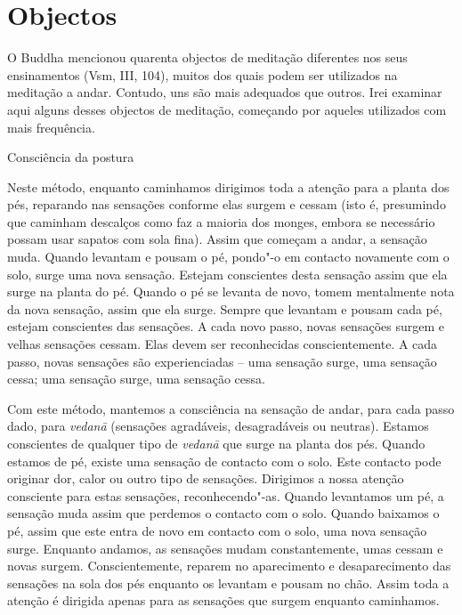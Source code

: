 
\chapter{Objectos}

O Buddha mencionou quarenta objectos de meditação diferentes nos
seus ensinamentos (Vsm, III, 104), muitos dos quais podem ser utilizados
na meditação a andar. Contudo, uns são mais adequados que outros. Irei
examinar aqui alguns desses objectos de meditação, começando por aqueles
utilizados com mais frequência.

\begin{siderule-quote}
  Consciência da postura
\end{siderule-quote}

Neste método, enquanto caminhamos dirigimos toda a atenção para a planta
dos pés, reparando nas sensações conforme elas surgem e cessam (isto é,
presumindo que caminham descalços como faz a maioria dos monges, embora
se necessário possam usar sapatos com sola fina). Assim que começam a
andar, a sensação muda. Quando levantam e pousam o pé, pondo"-o em
contacto novamente com o solo, surge uma nova sensação. Estejam
conscientes desta sensação assim que ela surge na planta do pé. Quando o
pé se levanta de novo, tomem mentalmente nota da nova sensação, assim
que ela surge. Sempre que levantam e pousam cada pé, estejam conscientes
das sensações. A cada novo passo, novas sensações surgem e velhas
sensações cessam. Elas devem ser reconhecidas conscientemente. A cada
passo, novas sensações são experienciadas -- uma sensação surge, uma
sensação cessa; uma sensação surge, uma sensação cessa.

Com este método, mantemos a consciência na sensação de andar, para cada
passo dado, para \emph{vedanā} (sensações agradáveis, desagradáveis ou
neutras). Estamos conscientes de qualquer tipo de \emph{vedanā} que
surge na planta dos pés. Quando estamos de pé, existe uma sensação de
contacto com o solo. Este contacto pode originar dor, calor ou outro
tipo de sensações. Dirigimos a nossa atenção consciente para estas sensações,
reconhecendo"-as. Quando levantamos um pé, a sensação muda assim que
perdemos o contacto com o solo. Quando baixamos o pé, assim que este
entra de novo em contacto com o solo, uma nova sensação surge. Enquanto
andamos, as sensações mudam constantemente, umas cessam e novas surgem.
Conscientemente, reparem no aparecimento e desaparecimento das
sensações na sola dos pés enquanto os levantam e pousam no chão. Assim
toda a atenção é dirigida apenas para as sensações que surgem enquanto
caminhamos.

